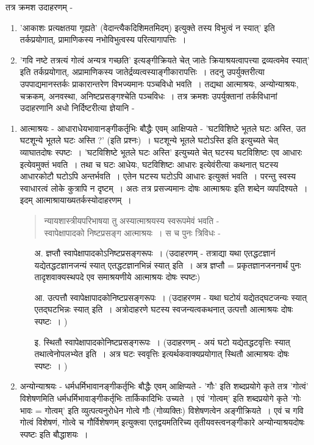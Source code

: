 {तत्र क्रमश उदाहरणम् - 
\begin{enumerate}
\item	'आकाशः प्रत्यक्षतया गृह्यते' (वेदान्त्यैकदिशिमतमिदम्) इत्युक्ते तस्य विभुत्वं न  स्यात्' इति तर्कप्रयोगात्, प्रामाणिकस्य नभोविभुत्वस्य परित्यागापत्तिः~। 
\item	'गवि नष्टे तत्रत्यं गोत्वं अन्यत्र गच्छति' इत्यङ्गीक्रियते चेत् जातेः क्रियाश्रयत्वा\-पत्त्या  द्रव्यत्वमेव स्यात्' इति तर्कप्रयोगात्, अप्रामाणिकस्य जातेर्द्रव्यत्वस्याङ्गीकारा\-पत्तिः~। तदनु उपर्युक्तरीत्या उपपाद्यमानस्तर्कः प्राकारान्तरेण विभज्यमानः पञ्चविधो भवति~। तद्यथा आत्माश्रयः, अन्योन्याश्रयः, चक्रकम्, अनवस्था, अनिष्टप्रसङ्गश्चेति पञ्चविधः~। तत्र क्रमशः उपर्युक्तानां तर्कविधानां उदाहरणानि अधो निर्दिष्टरीत्या ज्ञेयानि - 
\end{enumerate}
\begin{enumerate}
\item आत्माश्रयः - आधाराधेयभावानङ्गीकर्तृभिः बौद्धैः एवम् आक्षिप्यते - 'घटविशिष्टे भूतले घटः अस्ति, उत घटशून्ये भूतले घटः अस्ति ?' (इति प्रश्नः)~। घटशून्ये भूतले घटोऽस्ति इति इत्युच्यते चेत् व्याघातदोषः स्पष्टः~। 'घटविशिष्टे भूतले घटः अस्ति' इत्युच्यते चेत् घटस्य घटविशिष्टः एव आधारः इत्येवमुक्तं भवति~। तथा च घटः आधेयः, घटविशिष्टः आधारः इत्येवंरीत्या कथनात् घटस्य आधारकोटौ घटोऽपि अन्तर्भवति~। एतेन घटस्य घटोऽपि आधारः इत्युक्तं भवति~। परन्तु स्वस्य स्वाधारत्वं लोके कुत्रापि न दृष्टम्~। अतः तत्र प्रसज्यमानः दोषः आत्माश्रयः इति शब्देन व्यपदिश्यते~। इदम् आत्माश्रायाख्यतर्कस्योदाहरणम्~। 
\begin{verse}
न्यायशास्त्रीयपरिभाषया तु अस्यात्माश्रयस्य स्वरूपमेवं भवति - \\
स्वापेक्षापादको निष्टप्रसङ्ग आत्माश्रयः~। स च पुनः त्रिविधः  -
\end{verse}
	\begin{itemize}
		\item[अ.] ज्ञप्तौ स्वापेक्षापादकोऽनिष्टप्रसङ्गरूपः~। (उदाहरणम् - तत्राद्या यथा एतद्धटज्ञानं  यद्येतद्धटज्ञानजन्यं स्यात् एतद्धटज्ञानभिन्नं स्यात् इति~। अत्र ज्ञप्तौ = प्रकृतज्ञानजननार्थं पुनः तादृशवाक्यस्थपदे एव समाश्रयणीये आत्माश्रयः दोषः स्पष्टः)
		\item[आ.]	उत्पत्तौ स्वापेक्षापादकोनिष्टप्रसङ्गरूपः~। (उदाहरणम - यथा घटोयं यद्येतद्घटजन्यः  स्यात् एतद्घटभिन्नः स्यात् इति~। अत्रोदाहरणे घटस्य स्वजन्यत्वकथनात् उत्पत्तौ आत्माश्रयः दोषः स्पष्टः~। )
		\item[इ.]	स्थितौ स्वापेक्षापादकोनिष्टप्रसङ्गरूपः~। (उदाहरणम् - अयं घटो यद्येतद्धट\-वृत्तिः  स्यात् तथात्वेनोपलभ्येत इति~। अत्र घटः स्ववृत्तिः इत्यर्थकवाक्य\-प्रयोगात् स्थितौ आत्माश्रयः दोषः स्पष्टः~। )
	\end{itemize}
\item	अन्योन्याश्रयः - धर्मधर्मिभावानङ्गीकर्तृभिः बौद्धैः एवम् आक्षिप्यते - 'गौः' इति  शब्दप्रयोगे कृते तत्र 'गोत्वं' विशेषणमिति धर्मधर्मिभावाङ्गीकर्तृभिः तार्किकादिभिः उच्यते~। एवं 'गोत्वम्' इति शब्दप्रयोगे कृते 'गोः भावः = गोत्वम्' इति व्युत्पत्यनुरोधेन गोत्वे गौः (गोव्यक्तिः) विशेषणत्वेन अङ्गीक्रियते~। एवं च गवि गोत्वं विशेषणं, गोत्वे च गौर्विशेषणम् इत्युक्त्वा एतद्वयमतिरिच्य तृतीयवस्त्वनङ्गीकारे अन्योन्याश्रयदोषः स्पष्टः इति बौद्धाशयः~।  


\end{enumerate}}
